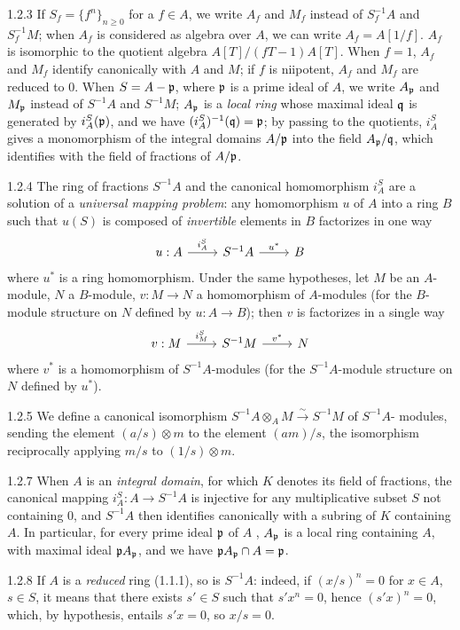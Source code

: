 \documentclass[../main.tex]{subfiles}
\begin{document}
\begin{cx}{1.2.3}
If $S_f=\{f^n\}_{n\geq 0}$ for a $f\in A$, we write $A_f$ and $M_f$ instead of $S_f^{-1}A$ and $S_f^{-1}M$; when $A_f$ is
considered as algebra over $A$, we can write $A_f=A[1/f]$. $A_f$ is isomorphic to the quotient algebra $A[T]/(fT-1)A[T]$.
When $f=1$, $A_f$ and $M_f$ identify canonically with $A$ and $M$; if $f$ is niipotent, $A_f$ and $M_f$ are reduced to $0$.
When $S=A-\mathfrak{p}$, where $\mathfrak{p}$ is a prime ideal of $A$, we write $A_\mathfrak{p}$ and $M_\mathfrak{p}$ instead of $S^{-1}A$ and $S^{-1}M$;
$A_\mathfrak{p}$ is a \emph{local ring} whose maximal ideal $\mathfrak{q}$ is generated by $i_A^S(\mathfrak{p})$, and we have
$(i_A^S)^{-1}(\mathfrak{q})=\mathfrak{p}$; by passing to the quotients, $i_A^S$ gives a monomorphism of the integral domains $A/\mathfrak{p}$ into the
field $A_\mathfrak{p}/\mathfrak{q}$, which identifies with the field of fractions of $A/\mathfrak{p}$.
\end{cx}

\begin{cx}{1.2.4}
The ring of fractions $S^{-1}A$ and the canonical homomorphism $i_A^S$ are a solution of a \emph{universal mapping problem}:
any homomorphism $u$ of $A$ into a ring $B$ such that $u(S)$ is composed of \emph{invertible} elements in $B$ factorizes in
one way
\[
\begin{tikzcd}
  u:A\ar[r,"i_A^S"] & S^{-1}A\ar[r,"u^\ast"] & B
\end{tikzcd}
\]
where $u^\ast$ is a ring homomorphism. Under the same hypotheses, let $M$ be an
$A$-module, $N$ a $B$-module, $v:M\to N$ a homomorphism of $A$-modules (for the
$B$-module structure on $N$ defined by $u:A\to B$); then $v$ is factorizes in a single
way
\[
\begin{tikzcd}
  v:M\ar[r,"i_M^S"] & S^{-1}M\ar[r,"v^\ast"] & N
\end{tikzcd}
\]
where $v^\ast$ is a homomorphism of $S^{-1}A$-modules (for the $S^{-1}A$-module structure 
on $N$ defined by $u^\ast$).
\end{cx}

\begin{cx}{1.2.5}
We define a canonical isomorphism $S^{-1}A\otimes_A M\xrightarrow{\sim} S^{-1}M$ of $S^{-1}A$-
modules, sending the element $(a/s)\otimes m$ to the element $(am)/s$, the isomorphism
reciprocally applying $m/s$ to $(1/s)\otimes m$.
\end{cx}

\begin{cx}{1.2.7}
When $A$ is an \emph{integral domain}, for which $K$ denotes its field of fractions, the canonical mapping $i_A^S:A\to S^{-1}A$
is injective for any multiplicative subset $S$ not containing $0$, and $S^{-1}A$ then identifies canonically with a subring of $K$
containing $A$. In particular, for every prime ideal $\mathfrak{p}$ of $A$ , $A_\mathfrak{p}$ is a local ring containing $A$,
with maximal ideal $\mathfrak{p}A_\mathfrak{p}$, and we have $\mathfrak{p}A_\mathfrak{p}\cap A=\mathfrak{p}$.
\end{cx}

\begin{cx}{1.2.8}
If $A$ is a \emph{reduced} ring (1.1.1), so is $S^{-1}A$: indeed, if $(x/s)^n=0$ for $x\in A$, $s\in S$, it means that
there exists $s'\in S$ such that $s'x^n=0$, hence $(s'x)^n=0$, which, by hypothesis, entails $s'x=0$, so $x/s=0$.
\end{cx}
\end{document}
